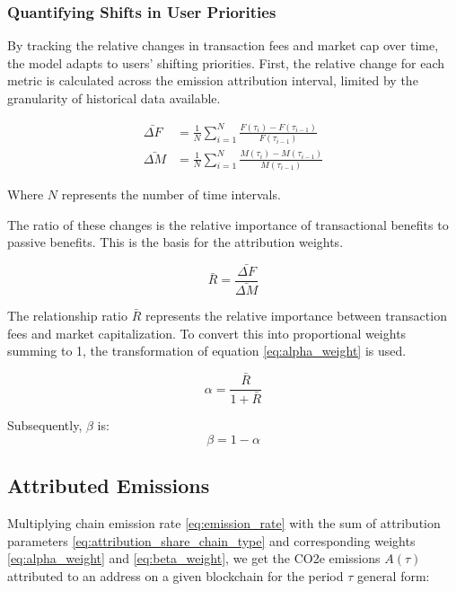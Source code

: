 \documentclass[11pt]{report}
\begin{document}
\subsubsection{Quantifying Shifts in User Priorities}

By tracking the relative changes in transaction fees and market cap over time, the model adapts to users' shifting priorities. First, the relative change for each metric is calculated across the emission attribution interval, limited by the granularity of historical data available.

\begin{align}
    \bar{\Delta F} & = \frac{1}{N}\sum_{i=1}^{N}\frac{F(\tau_i) - F(\tau_{i-1})}{F(\tau_{i-1})} \\
    \bar{\Delta M} & = \frac{1}{N}\sum_{i=1}^{N}\frac{M(\tau_i) - M(\tau_{i-1})}{M(\tau_{i-1})}
\end{align}



Where \( N \) represents the number of time intervals.

The ratio of these changes is the relative importance of transactional benefits to passive benefits. This is the basis for the attribution weights.

\begin{equation} \label{eq:weights_ratio}
    \bar{R} = \frac{\bar{\Delta F}}{\bar{\Delta M}}
\end{equation}

The relationship ratio $\bar{R}$ represents the relative importance between transaction fees and market capitalization. To convert this into proportional weights summing to 1, the transformation of equation \eqref{eq:alpha_weight} is used.

\begin{equation} \label{eq:alpha_weight}
    \alpha = \frac{\bar{R}}{1 + \bar{R}}
\end{equation}

Subsequently, \( \beta \) is:
\begin{equation} \label{eq:beta_weight}
    \beta = 1 - \alpha
\end{equation}


\subsection{Attributed Emissions \label{se:attributed_emissions}}

Multiplying chain emission rate \eqref{eq:emission_rate} with the sum of attribution parameters \eqref{eq:attribution_share_chain_type} and corresponding weights \eqref{eq:alpha_weight} and \eqref{eq:beta_weight}, we get the CO2e emissions \(A(\tau)\) attributed to an address on a given blockchain for the period $\tau$ general form:
\end{document}
